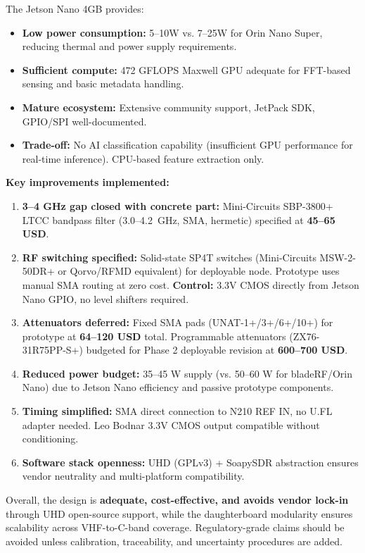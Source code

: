 \documentclass[11pt,a4paper]{article}
\newcommand{\blue}[1]{\textcolor{priceblue}{\textbf{#1}}}
\begin{document}
	The Jetson Nano 4GB provides:
	\begin{itemize}
		\item \textbf{Low power consumption:} 5--10W vs. 7--25W for Orin Nano Super,
		reducing thermal and power supply requirements.
		\item \textbf{Sufficient compute:} 472 GFLOPS Maxwell GPU adequate for FFT-based
		sensing and basic metadata handling.
		\item \textbf{Mature ecosystem:} Extensive community support, JetPack SDK,
		GPIO/SPI well-documented.
		\item \textbf{Trade-off:} No AI classification capability (insufficient GPU
		performance for real-time inference). CPU-based feature extraction only.
	\end{itemize}
	
	\textbf{Key improvements implemented:}
	\begin{enumerate}
		\item \textbf{3--4 GHz gap closed with concrete part:} Mini-Circuits SBP-3800+
		LTCC bandpass filter (3.0--4.2~GHz, SMA, hermetic) specified at \blue{45--65 USD}.
		\item \textbf{RF switching specified:} Solid-state SP4T switches (Mini-Circuits
		MSW-2-50DR+ or Qorvo/RFMD equivalent) for deployable node. Prototype uses
		manual SMA routing at zero cost. \textbf{Control:} 3.3V CMOS directly from
		Jetson Nano GPIO, no level shifters required.
		\item \textbf{Attenuators deferred:} Fixed SMA pads (UNAT-1+/3+/6+/10+) for
		prototype at \blue{64--120 USD} total. Programmable attenuators (ZX76-31R75PP-S+)
		budgeted for Phase 2 deployable revision at \blue{600--700 USD}.
		\item \textbf{Reduced power budget:} 35--45 W supply (vs. 50--60 W for
		bladeRF/Orin Nano) due to Jetson Nano efficiency and passive prototype components.
		\item \textbf{Timing simplified:} SMA direct connection to N210 REF IN, no U.FL
		adapter needed. Leo Bodnar 3.3V CMOS output compatible without conditioning.
		\item \textbf{Software stack openness:} UHD (GPLv3) + SoapySDR abstraction ensures
		vendor neutrality and multi-platform compatibility.
	\end{enumerate}
	
	Overall, the design is \textbf{adequate, cost-effective, and avoids vendor
		lock-in} through UHD open-source support, while the daughterboard modularity
	ensures scalability across VHF-to-C-band coverage. Regulatory-grade claims
	should be avoided unless calibration, traceability, and uncertainty procedures
	are added.
	
\end{document}
